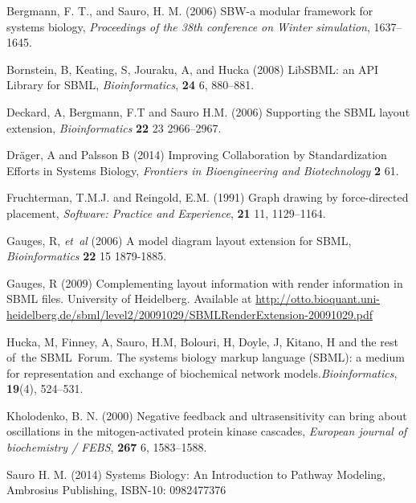\documentclass{bioinfo}
\begin{document}
\begin{thebibliography}{}

 Bergmann, F. T., and Sauro, H. M. (2006) SBW-a modular framework for systems biology, {\it Proceedings of the 38th conference on Winter simulation}, 1637--1645.

 Bornstein, B, Keating, S, Jouraku, A, and Hucka (2008) LibSBML: an API Library for SBML, {\it Bioinformatics}, {\bf 24} 6, 880--881.

 Deckard, A, Bergmann, F.T and Sauro H.M. (2006) Supporting the SBML layout extension, {\it Bioinformatics} {\bf 22} 23 2966--2967.

 Dr\"{a}ger, A and Palsson B (2014) Improving Collaboration by Standardization Efforts in Systems Biology, {\it Frontiers in Bioengineering and Biotechnology} {\bf 2} 61.

 Fruchterman, T.M.J. and Reingold, E.M. (1991) Graph drawing by force-directed placement, {\it Software: Practice and Experience}, {\bf 21} 11, 1129--1164.

 Gauges, R, {\it et~al} (2006) A model diagram layout extension for SBML, {\it Bioinformatics} {\bf 22} 15 1879-1885.

 Gauges, R (2009) Complementing layout information with render information in SBML files.  University of Heidelberg. Available at \href{http://otto.bioquant.uni-heidelberg.de/sbml/level2/20091029/SBMLRenderExtension-20091029.pdf}{http://otto.bioquant.uni-heidelberg.de/sbml/level2/20091029/SBMLRenderExtension-20091029.pdf}

 Hucka, M, Finney, A, Sauro, H.M, Bolouri, H, Doyle, J, Kitano, H and
  the rest of~the SBML~Forum. The systems biology markup language (SBML): a medium for representation and exchange of biochemical network models.{\em Bioinformatics\/}, {\bf 19}(4), 524--531.

 Kholodenko, B. N. (2000) Negative feedback and ultrasensitivity can bring about oscillations in the mitogen-activated protein kinase cascades, {\it European journal of biochemistry / FEBS}, {\bf 267} 6, 1583--1588.

 Sauro H. M. (2014) Systems Biology: An Introduction to Pathway Modeling, Ambrosius Publishing, ISBN-10: 0982477376


\end{thebibliography}
\end{document}
